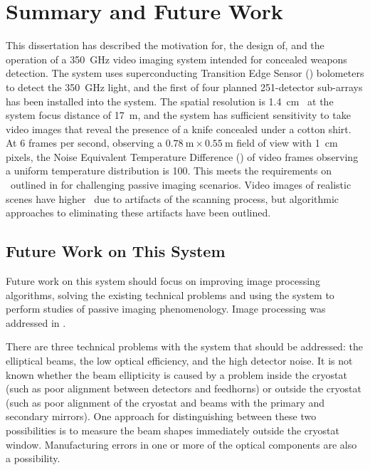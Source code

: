 \chapter{Summary and Future Work} \label{c:summary}

This dissertation has described the motivation for, the design of, and the operation of a \SI{350}{\GHz} video imaging system intended for concealed weapons detection.
The system uses superconducting Transition Edge Sensor (\TES) bolometers to detect the \SI{350}{\GHz} light, and the first of four planned 251-detector sub-arrays has been installed into the system.
The spatial resolution is \SI{1.4}{\cm} \FWHM\ at the system focus distance of \SI{17}{\m}, and the system has sufficient sensitivity to take video images that reveal the presence of a knife concealed under a cotton shirt.
At 6 frames per second, observing a $\SI{0.78}{\m} \times \SI{0.55}{\m}$ field of view with \SI{1}{\cm} pixels, the Noise Equivalent Temperature Difference (\NETD) of video frames observing a uniform temperature distribution is \SI{100}{\mK}.
This meets the requirements on \NETD\ outlined in  for challenging passive imaging scenarios.
Video images of realistic scenes have higher \NETD\ due to artifacts of the scanning process, but algorithmic approaches to eliminating these artifacts have been outlined.

\section{Future Work on This System} \label{sec:ch8-future}

Future work on this system should focus on improving image processing algorithms, solving the existing technical problems and using the system to perform studies of passive imaging phenomenology.
Image processing was addressed in .

There are three technical problems with the system that should be addressed: the elliptical beams, the low optical efficiency, and the high detector noise.
It is not known whether the beam ellipticity is caused by a problem inside the cryostat (such as poor alignment between detectors and feedhorns) or outside the cryostat (such as poor alignment of the cryostat and beams with the primary and secondary mirrors).
One approach for distinguishing between these two possibilities is to measure the beam shapes immediately outside the cryostat window.
Manufacturing errors in one or more of the optical components are also a possibility.

